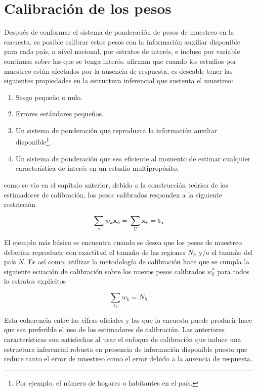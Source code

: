 \documentclass[
  10pt,
  spanish,
]{book}
\providecommand{\tightlist}{%
  \setlength{\itemsep}{0pt}\setlength{\parskip}{0pt}}
\begin{document}
\hypertarget{calibraciuxf3n-de-los-pesos}{%
\section{Calibración de los pesos}\label{calibraciuxf3n-de-los-pesos}}

Después de conformar el sistema de ponderación de pesos de muestreo en la encuesta, es posible calibrar estos pesos con la información auxiliar disponible para cada país, a nivel nacional, por estratos de interés, e incluso por variable continuas sobre las que se tenga interés. \citet{Sarndal_Lundstrom_2006} afirman que cuando los estudios por muestreo están afectados por la ausencia de respuesta, es deseable tener las siguientes propiedades en la estructura inferencial que sustenta el muestreo:

\begin{enumerate}
\def\labelenumi{\arabic{enumi}.}
\tightlist
\item
  Sesgo pequeño o nulo.
\item
  Errores estándares pequeños.
\item
  Un sistema de ponderación que reproduzca la información auxiliar disponible\footnote{Por ejemplo, el número de hogares o habitantes en el país.}.
\item
  Un sistema de ponderación que sea eficiente al momento de estimar cualquier característica de interés en un estudio multipropósito.
\end{enumerate}

como se vio en el capítulo anterior, debido a la construcción teórica de los estimadores de calibración, los pesos calibrados responden a la siguiente restricción

\[
\sum_{s}w_{k}\boldsymbol{x}_k = \sum_{U}\boldsymbol{x}_{k} = \boldsymbol{t}_{\boldsymbol{x}}
\]

El ejemplo más básico se encuentra cuando se desea que los pesos de muestreo deberían reproducir con exactitud el tamaño de las regiones \(N_h\) y/o el tamaño del país \(N\). Es así como, utilizar la metodología de calibración \citep{Deville_Sarndal_1992} hace que se cumpla la siguiente ecuación de calibración sobre los nuevos pesos calibrados \(w_k^*\) para todos lo estratos explícitos

\[
\sum_{s_h} w_k = N_h
\]

Esta coherencia entre las cifras oficiales y las que la encuesta puede producir hace que sea preferible el uso de los estimadores de calibración. Las anteriores características son satisfechas al usar el enfoque de calibración que induce una estructura inferencial robusta en presencia de información disponible puesto que reduce tanto el error de muestreo como el error debido a la ausencia de respuesta.
\end{document}
